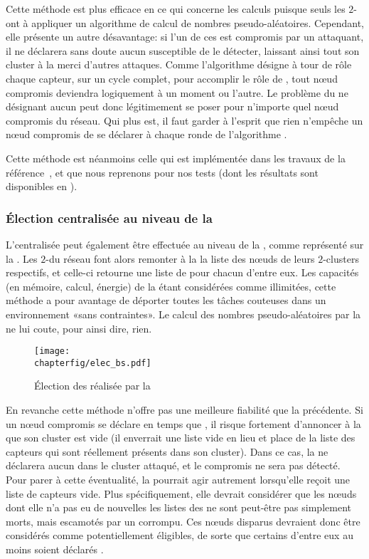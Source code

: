 Cette méthode est plus efficace en ce qui concerne les calculs puisque seuls les $2$-\CH ont à appliquer un algorithme de calcul de nombres pseudo-aléatoires.
Cependant, elle présente un autre désavantage: si l'un de ces \CH est compromis par un attaquant, il ne déclarera sans doute aucun \cn susceptible de le détecter, laissant ainsi tout son cluster à la merci d'autres attaques.
Comme l'algorithme \leach désigne à tour de rôle chaque capteur, sur un cycle complet, pour accomplir le rôle de \CH, tout nœud compromis deviendra logiquement \CH à un moment ou l'autre.
Le problème du \CH ne désignant aucun \cn peut donc légitimement se poser pour n'importe quel nœud compromis du réseau.
Qui plus est, il faut garder à l'esprit que rien n'empêche un nœud compromis de se déclarer \ch à chaque ronde de l'algorithme \leach.

Cette méthode est néanmoins celle qui est implémentée dans les travaux de la référence~\cite{GMT12}, et que nous reprenons pour nos tests (dont les résultats sont disponibles en ).

        \subsubsection{Élection centralisée au niveau de la \sdb}
L'\election centralisée peut également être effectuée au niveau de la \sdb, comme représenté sur la .
Les $2$-\CH du réseau font alors remonter à la \sdb la liste des nœuds de leurs $2$-clusters respectifs, et celle-ci retourne une liste de \cns pour chacun d'entre eux.
Les capacités (en mémoire, calcul, énergie) de la \sdb étant considérées comme illimitées, cette méthode a pour avantage de déporter toutes les tâches couteuses dans un environnement «sans contraintes».
Le calcul des nombres pseudo-aléatoires par la \sdb ne lui coute, pour ainsi dire, rien.
\begin{figure}[ht]
    \centering
    \texttt{[image: \\chapterfig/elec\_bs.pdf]}
    \caption{Élection des \cns réalisée par la \sdb}\label{sa:fig:elecbs}
\end{figure}

En revanche cette méthode n'offre pas une meilleure fiabilité que la précédente.
Si un nœud compromis se déclare en temps que \CH, il risque fortement d'annoncer à la \sdb que son cluster est vide (il enverrait une liste vide en lieu et place de la liste des capteurs qui sont réellement présents dans son cluster).
Dans ce cas, la \sdb ne déclarera aucun \cn dans le cluster attaqué, et le \CH compromis ne sera pas détecté.
Pour parer à cette éventualité, la \sdb pourrait agir autrement lorsqu'elle reçoit une liste de capteurs vide.
Plus spécifiquement, elle devrait considérer que les nœuds dont elle n'a pas eu de nouvelles \via les listes des \CH ne sont peut-être pas simplement morts, mais escamotés par un \ch corrompu.
Ces nœuds disparus devraient donc être considérés comme potentiellement éligibles, de sorte que certains d'entre eux au moins soient déclarés \cns.

